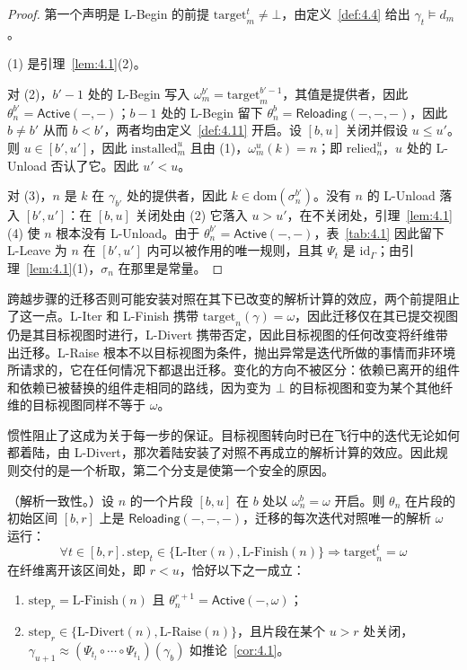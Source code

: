 \begin{proof}
第一个声明是 L-Begin 的前提 $\mathrm{target}^t_m \neq \bot$，由定义~\ref{def:4.4} 给出 $\gamma_t \models d_m$。

(1) 是引理~\ref{lem:4.1}(2)。

对 (2)，$b' - 1$ 处的 L-Begin 写入 $\omega^{b'}_m = \mathrm{target}^{b'-1}_m$，其值是提供者，因此 $\theta^{b'}_n = \mathsf{Active}(-, -)$；$b - 1$ 处的 L-Begin 留下 $\theta^b_n = \mathsf{Reloading}(-, -, -)$，因此 $b \neq b'$ 从而 $b < b'$，两者均由定义~\ref{def:4.11} 开启。设 $[b, u]$ 关闭并假设 $u \leqslant u'$。则 $u \in [b', u']$，因此 $\mathrm{installed}^u_m$ 且由 (1)，$\omega^u_m(k) = n$；即 $\mathrm{relied}^u_n$，$u$ 处的 L-Unload 否认了它。因此 $u' < u$。

对 (3)，$n$ 是 $k$ 在 $\gamma_{b'}$ 处的提供者，因此 $k \in \mathrm{dom}(\sigma^{b'}_n)$。没有 $n$ 的 L-Unload 落入 $[b', u']$：在 $[b, u]$ 关闭处由 (2) 它落入 $u > u'$，在不关闭处，引理~\ref{lem:4.1}(4) 使 $n$ 根本没有 L-Unload。由于 $\theta^{b'}_n = \mathsf{Active}(-, -)$，表~\ref{tab:4.1} 因此留下 L-Leave 为 $n$ 在 $[b', u']$ 内可以被作用的唯一规则，且其 $\Psi_t$ 是 $\mathrm{id}_\Gamma$；由引理~\ref{lem:4.1}(1)，$\sigma_n$ 在那里是常量。
\end{proof}

跨越步骤的迁移否则可能安装对照在其下已改变的解析计算的效应，两个前提阻止了这一点。L-Iter 和 L-Finish 携带 $\mathrm{target}_n(\gamma) = \omega$，因此迁移仅在其已提交视图仍是其目标视图时进行，L-Divert 携带否定，因此目标视图的任何改变将纤维带出迁移。L-Raise 根本不以目标视图为条件，抛出异常是迭代所做的事情而非环境所请求的，它在任何情况下都退出迁移。变化的方向不被区分：依赖已离开的组件和依赖已被替换的组件走相同的路线，因为变为 $\bot$ 的目标视图和变为某个其他纤维的目标视图同样不等于 $\omega$。

惯性阻止了这成为关于每一步的保证。目标视图转向时已在飞行中的迭代无论如何都着陆，由 L-Divert，那次着陆安装了对照不再成立的解析计算的效应。因此规则交付的是一个析取，第二个分支是使第一个安全的原因。

\begin{theorem}\label{thm:4.4}
（解析一致性。）设 $n$ 的一个片段 $[b, u]$ 在 $b$ 处以 $\omega^b_n = \omega$ 开启。则 $\theta_n$ 在片段的初始区间 $[b, r]$ 上是 $\mathsf{Reloading}(-, -, -)$，迁移的每次迭代对照唯一的解析 $\omega$ 运行：
\begin{equation}\label{eq:4.28}
\forall t \in [b, r].\, \mathrm{step}_t \in \{\text{L-Iter}(n), \text{L-Finish}(n)\} \Rightarrow \mathrm{target}^t_n = \omega
\end{equation}
在纤维离开该区间处，即 $r < u$，恰好以下之一成立：
\begin{enumerate}
\item $\mathrm{step}_r = \text{L-Finish}(n)$ 且 $\theta^{r+1}_n = \mathsf{Active}(-, \omega)$；
\item $\mathrm{step}_r \in \{\text{L-Divert}(n), \text{L-Raise}(n)\}$，且片段在某个 $u > r$ 处关闭，$\gamma_{u+1} \approx (\Psi_{t_l} \circ \cdots \circ \Psi_{t_1})(\gamma_b)$ 如推论~\ref{cor:4.1}。
\end{enumerate}
\end{theorem}


